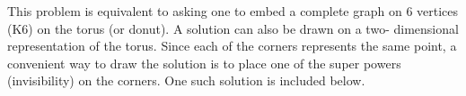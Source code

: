


This problem is equivalent to asking one to embed a complete graph on 6
vertices (K6) on the torus (or donut). A solution can also be drawn on a two-
dimensional representation of the torus. Since each of the corners represents the
same point, a convenient way to draw the solution is to place one of the super
powers (invisibility) on the corners. One such solution is included below.
